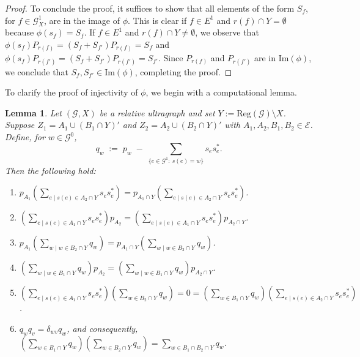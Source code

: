 \documentclass[12pt, reqno]{amsart}
\newtheorem{lemma}[theorem]{Lemma}
\theoremstyle{definition}
\theoremstyle{remark}
\numberwithin{equation}{section}
\newcommand{\G}{\mathcal{G}}
\begin{document}
\begin{proof}
To conclude the proof, it suffices to show that all elements of the form \(S_f\), for \(f \in \G_X^1\), are in the image of \(\phi\). This is clear if \(f \in E^1\) and \(r(f) \cap Y = \emptyset\) because \(\phi(s_f) = S_f\). If \(f \in E^1\) and \(r(f) \cap Y \neq \emptyset\), we observe that $
\phi(s_f) P_{r(f)} = (S_f + S_{f'}) P_{r(f)} = S_f$ and $
\phi(s_f) P_{r(f')} = (S_f + S_{f'}) P_{r(f')} = S_{f'}
$.
Since \(P_{r(f)}\) and \(P_{r(f')}\) are in \(\text{Im}(\phi)\), we conclude that \(S_f, S_{f'} \in \text{Im}(\phi)\), completing the proof.


\end{proof}


To clarify the proof of injectivity of $\phi$, we begin with a computational lemma.


\begin{lemma}\label{contas1}
Let $(\mathcal{G},X)$ be a relative ultragraph and set $Y:=\mathrm{Reg}(\mathcal{G})\setminus X$.
Suppose $Z_1=A_1\cup (B_1\cap Y)'$ and $Z_2=A_2\cup (B_2\cap Y)'$ with $A_1,A_2,B_1,B_2\in\mathcal{E}$.
Define, for $w\in \mathcal{G}^0$,
\[
q_w \;:=\; p_w \;-\; \sum_{\{e\in \mathcal{G}^1:\ s(e)=w\}} s_e s_e^* .
\]
Then the following hold:
\begin{enumerate}
    \item \(p_{A_1} \left( \sum\limits_{e \mid s(e) \in A_2 \cap Y} s_e s_e^* \right) = p_{A_1 \cap Y} \left( \sum\limits_{e \mid s(e) \in A_2 \cap Y} s_e s_e^* \right)\).
    \item \(\left( \sum\limits_{e \mid s(e) \in A_1 \cap Y} s_e s_e^* \right) p_{A_2} = \left( \sum\limits_{e \mid s(e) \in A_1 \cap Y} s_e s_e^* \right) p_{A_2 \cap Y}\).
    \item \(p_{A_1} \left( \sum\limits_{w \mid w \in B_2 \cap Y} q_w \right) = p_{A_1 \cap Y} \left( \sum\limits_{w \mid w \in B_2 \cap Y} q_w \right)\).
    \item \(\left( \sum\limits_{w \mid w \in B_1 \cap Y} q_w \right) p_{A_2} = \left( \sum\limits_{w \mid w \in B_1 \cap Y} q_w \right) p_{A_2 \cap Y}\).
    \item \(\left( \sum\limits_{e \mid s(e) \in A_1 \cap Y} s_e s_e^* \right) \left( \sum\limits_{w \in B_2 \cap Y} q_w \right) = 0 = \left( \sum\limits_{w \in B_1 \cap Y} q_w \right) \left( \sum\limits_{e \mid s(e) \in A_2 \cap Y} s_e s_e^* \right)\).
    \item \(q_w q_v = \delta_{wv} q_w\), and consequently, \(\left( \sum\limits_{w \in B_1 \cap Y} q_w \right) \left( \sum\limits_{w \in B_2 \cap Y} q_w \right) = \sum\limits_{w \in B_1 \cap B_2 \cap Y} q_w\).
\end{enumerate}
\end{lemma}
\end{document}
